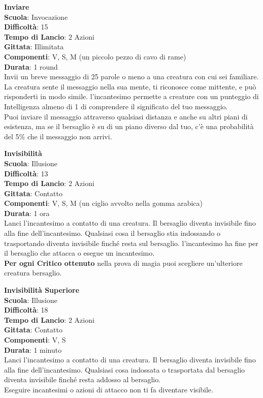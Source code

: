 \begin{multicols}{2}
\medskip\textbf{Inviare}\\
\textbf{Scuola}: Invocazione\\
\textbf{Difficoltà}:  15\\
\textbf{Tempo di Lancio}: 2 Azioni\\
\textbf{Gittata}: Illimitata\\
\textbf{Componenti}: V, S, M (un piccolo pezzo di cavo di rame)\\
\textbf{Durata}: 1 round\\
Invii un breve messaggio di 25 parole o meno a una creatura con cui sei familiare. La creatura sente il messaggio nella sua mente, ti riconosce come mittente, e può risponderti in modo simile. l'incantesimo permette a creature con un punteggio di Intelligenza almeno di 1 di comprendere il significato del tuo messaggio.\\
Puoi inviare il messaggio attraverso qualsiasi distanza e anche su altri piani di esistenza, ma se il bersaglio è su di un piano diverso dal tuo, c’è una probabilità del 5\% che il messaggio non arrivi.

\medskip\textbf{Invisibilità}\\
\textbf{Scuola}: Illusione\\
\textbf{Difficoltà}:  13\\
\textbf{Tempo di Lancio}: 2 Azioni\\
\textbf{Gittata}: Contatto\\
\textbf{Componenti}: V, S, M (un ciglio avvolto nella gomma arabica)\\
\textbf{Durata}: 1 ora \\
Lanci l'incantesimo a contatto di una creatura. Il bersaglio diventa invisibile fino alla fine dell'incantesimo. Qualsiasi cosa il bersaglio stia indossando o trasportando diventa invisibile finché resta sul bersaglio. l'incantesimo ha fine per il bersaglio che attacca o esegue un incantesimo.\\
\textbf{Per ogni Critico ottenuto} nella prova di magia puoi scegliere un'ulteriore creatura bersaglio.

\medskip\textbf{Invisibilità Superiore}\\
\textbf{Scuola}: Illusione\\
\textbf{Difficoltà}:  18\\
\textbf{Tempo di Lancio}: 2 Azioni\\
\textbf{Gittata}: Contatto\\
\textbf{Componenti}: V, S\\
\textbf{Durata}: 1 minuto\\
Lanci l'incantesimo a contatto di una creatura. Il bersaglio diventa invisibile fino alla fine dell'incantesimo. Qualsiasi cosa indossata o trasportata dal bersaglio diventa invisibile finché resta addosso al bersaglio.\\
Eseguire incantesimi o azioni di attacco non ti fa diventare visibile.



\end{multicols}
